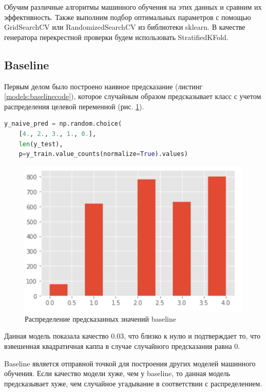 \documentclass[14pt]{mmcs_article}
\begin{document}
Обучим различные алгоритмы машинного обучения на этих данных и сравним их эффективность. Также выполним подбор оптимальных параметров с помощью GridSearchCV или RandomizedSearchCV из библиотеки sklearn. В качестве генератора перекрестной проверки будем использовать StratifiedKFold.


\subsection{Baseline}

Первым делом было построено наивное предсказание (листинг \ref{models:baselinecode}), которое случайным образом предсказывает класс с учетом распределения целевой переменной (рис. \ref{models:baseline}).

\begin{lstlisting}[language=Python, caption={Python, создание baseline}, label=models:baselinecode]
y_naive_pred = np.random.choice(
	[4., 2., 3., 1., 0.], 
	len(y_test), 
	p=y_train.value_counts(normalize=True).values)
\end{lstlisting}

\begin{figure}[H]
	\centering
	\includegraphics[scale=1]{baseline.png}
	\caption{Распределение предсказанных значений baseline}\label{models:baseline}
\end{figure}

Данная модель показала качество 0.03, что близко к нулю и подтверждает то, что взвешенная квадратичная каппа в случае случайного предсказания равна 0.

Baseline является отправной точкой для построения других моделей машинного обучения. Если качество модели хуже, чем у baseline, то данная модель предсказывает хуже, чем случайное угадывание в соответствии с распределением.
\end{document}
